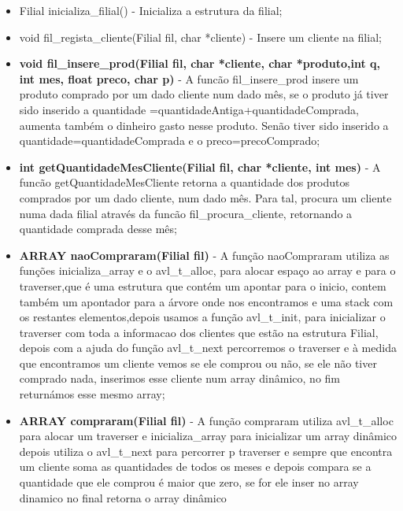 \begin{itemize}
\item	Filial inicializa\_filial() - Inicializa a estrutura da filial; 

\item	void fil\_regista\_cliente(Filial fil, char *cliente) - Insere um cliente na filial; 

\item 	\textbf{void fil\_insere\_prod(Filial fil, char *cliente, char *produto,int q, int mes, float preco, char p)} - A funcão fil\_insere\_prod insere  um produto comprado por um dado cliente num dado mês, se o produto já tiver sido inserido a quantidade =quantidadeAntiga+quantidadeComprada, aumenta também o dinheiro gasto nesse produto. Senão tiver sido inserido a quantidade=quantidadeComprada e o 
preco=precoComprado; 
 
\item	\textbf{int getQuantidadeMesCliente(Filial fil, char *cliente, int mes)} - A funcão getQuantidadeMesCliente retorna a quantidade dos produtos comprados por um dado cliente, num dado mês. Para tal, procura um cliente numa dada filial através da funcão fil\_procura\_cliente, retornando a quantidade comprada  desse mês; 

\item	\textbf{ARRAY naoCompraram(Filial fil)} - A função naoCompraram  utiliza as funções inicializa\_array e o avl\_t\_alloc, para alocar espaço ao array e para o 
traverser,que é uma estrutura que contém um apontar para o inicio, contem também um apontador para a árvore onde nos 
encontramos e uma stack com os restantes elementos,depois usamos a função avl\_t\_init, para inicializar o traverser
com toda a informacao dos clientes que estão na estrutura Filial, depois com a ajuda do função avl\_t\_next percorremos
o traverser e à medida que encontramos um cliente vemos se ele comprou ou não, se ele não tiver comprado nada,
inserimos esse cliente num array dinâmico, no fim returnámos esse mesmo array; 

\item	\textbf{ARRAY compraram(Filial fil)} - A função compraram utiliza avl\_t\_alloc para alocar um traverser e inicializa\_array para inicializar um array dinâmico 
depois utiliza o avl\_t\_next para percorrer p traverser e sempre que encontra um cliente soma as quantidades de todos os meses e depois compara se a quantidade que ele comprou é maior que zero, se for ele inser no array dinamico no final retorna o array dinâmico



\end{itemize}
